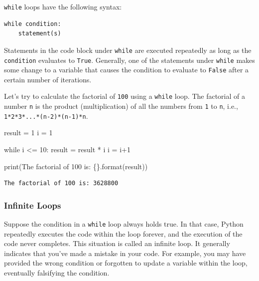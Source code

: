 \documentclass[
  letterpaper,
  DIV=11,
  numbers=noendperiod]{scrreprt}
\newenvironment{Shaded}{\begin{snugshade}}{\end{snugshade}}
\newcommand{\BuiltInTok}[1]{\textcolor[rgb]{0.00,0.23,0.31}{#1}}
\newcommand{\ControlFlowTok}[1]{\textcolor[rgb]{0.00,0.23,0.31}{#1}}
\newcommand{\DecValTok}[1]{\textcolor[rgb]{0.68,0.00,0.00}{#1}}
\newcommand{\NormalTok}[1]{\textcolor[rgb]{0.00,0.23,0.31}{#1}}
\newcommand{\OperatorTok}[1]{\textcolor[rgb]{0.37,0.37,0.37}{#1}}
\newcommand{\SpecialCharTok}[1]{\textcolor[rgb]{0.37,0.37,0.37}{#1}}
\newcommand{\StringTok}[1]{\textcolor[rgb]{0.13,0.47,0.30}{#1}}
\begin{document}
\texttt{while} loops have the following syntax:

\begin{verbatim}
while condition:
    statement(s)
\end{verbatim}

Statements in the code block under \texttt{while} are executed
repeatedly as long as the \texttt{condition} evaluates to \texttt{True}.
Generally, one of the statements under \texttt{while} makes some change
to a variable that causes the condition to evaluate to \texttt{False}
after a certain number of iterations.

Let's try to calculate the factorial of \texttt{100} using a
\texttt{while} loop. The factorial of a number \texttt{n} is the product
(multiplication) of all the numbers from \texttt{1} to \texttt{n}, i.e.,
\texttt{1*2*3*...*(n-2)*(n-1)*n}.

\begin{Shaded}
\begin{Highlighting}[]
\NormalTok{result }\OperatorTok{=} \DecValTok{1}
\NormalTok{i }\OperatorTok{=} \DecValTok{1}

\ControlFlowTok{while}\NormalTok{ i }\OperatorTok{\textless{}=} \DecValTok{10}\NormalTok{:}
\NormalTok{    result }\OperatorTok{=}\NormalTok{ result }\OperatorTok{*}\NormalTok{ i}
\NormalTok{    i }\OperatorTok{=}\NormalTok{ i}\OperatorTok{+}\DecValTok{1}

\BuiltInTok{print}\NormalTok{(}\StringTok{\textquotesingle{}The factorial of 100 is: }\SpecialCharTok{\{\}}\StringTok{\textquotesingle{}}\NormalTok{.}\BuiltInTok{format}\NormalTok{(result))}
\end{Highlighting}
\end{Shaded}

\begin{verbatim}
The factorial of 100 is: 3628800
\end{verbatim}

\hypertarget{infinite-loops}{%
\subsubsection{Infinite Loops}\label{infinite-loops}}

Suppose the condition in a \texttt{while} loop always holds true. In
that case, Python repeatedly executes the code within the loop forever,
and the execution of the code never completes. This situation is called
an infinite loop. It generally indicates that you've made a mistake in
your code. For example, you may have provided the wrong condition or
forgotten to update a variable within the loop, eventually falsifying
the condition.
\end{document}
